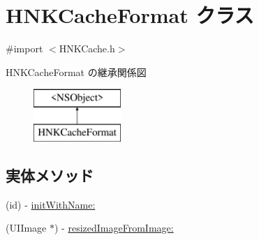 \hypertarget{interface_h_n_k_cache_format}{}\section{H\+N\+K\+Cache\+Format クラス}
\label{interface_h_n_k_cache_format}


{\ttfamily \#import $<$H\+N\+K\+Cache.\+h$>$}

H\+N\+K\+Cache\+Format の継承関係図\begin{figure}[H]
\begin{center}
\leavevmode
\includegraphics[height=2.000000cm]{interface_h_n_k_cache_format}
\end{center}
\end{figure}
\subsection*{実体メソッド}
\begin{DoxyCompactItemize}
\item 
(id) -\/ \hyperlink{interface_h_n_k_cache_format_aaf0bfc464371a36f6c7617a577e31ec9}{init\+With\+Name\+:}
\item 
(U\+I\+Image $\ast$) -\/ \hyperlink{interface_h_n_k_cache_format_a546c0846f6afd51b7f649f5f32a12fa0}{resized\+Image\+From\+Image\+:}
\end{DoxyCompactItemize}
